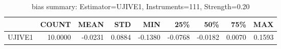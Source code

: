 \begin{table}[ht]
\centering
\caption{bias summary: Estimator=UJIVE1, Instruments=111, Strength=0.20}
\begin{tabular}{lrrrrrrrr}
\toprule
 & COUNT & MEAN & STD & MIN & 25\% & 50\% & 75\% & MAX \\
\midrule
UJIVE1 & 10.0000 & -0.0231 & 0.0884 & -0.1380 & -0.0768 & -0.0182 & 0.0070 & 0.1593 \\
\bottomrule
\end{tabular}
\end{table}
